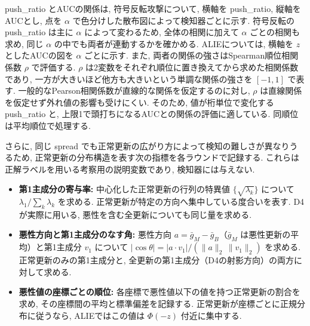 \documentclass[a4j, twocolumn, dvipdfmx]{jsarticle}
\newcommand{\PushRatio}{\textrm{push\_ratio}}
\newcommand{\Spread}{\textrm{spread}}
\begin{document}
\PushRatio{} とAUCの関係は, 符号反転攻撃について, 横軸を \PushRatio{}, 縦軸をAUCとし, 点を $\alpha$ で色分けした散布図によって検知器ごとに示す. 符号反転の \PushRatio{} は主に $\alpha$ によって変わるため, 全体の相関に加えて $\alpha$ ごとの相関も求め, 同じ $\alpha$ の中でも両者が連動するかを確かめる. ALIEについては, 横軸を $z$ としたAUCの図を $\alpha$ ごとに示す. また, 両者の関係の強さはSpearman順位相関係数 $\rho$ で評価する. $\rho$ は2変数をそれぞれ順位に置き換えてから求めた相関係数であり, 一方が大きいほど他方も大きいという単調な関係の強さを $[-1,1]$ で表す. 一般的なPearson相関係数が直線的な関係を仮定するのに対し, $\rho$ は直線関係を仮定せず外れ値の影響も受けにくい. そのため, 値が桁単位で変化する \PushRatio{} と, 上限1で頭打ちになるAUCとの関係の評価に適している. 同順位は平均順位で処理する.

さらに, 同じ \Spread{} でも正常更新の広がり方によって検知の難しさが異なりうるため, 正常更新の分布構造を表す次の指標を各ラウンドで記録する. これらは正解ラベルを用いる考察用の説明変数であり, 検知器には与えない.
\begin{itemize}
  \item \textbf{第1主成分の寄与率:} 中心化した正常更新の行列の特異値 $\{\sqrt{\lambda_k}\}$ について $\lambda_1 / \sum_k \lambda_k$ を求める. 正常更新が特定の方向へ集中している度合いを表す. D4が実際に用いる, 悪性を含む全更新についても同じ量を求める.
  \item \textbf{悪性方向と第1主成分のなす角:} 悪性方向 $a = \bar{g}_M - \bar{g}_B$（$\bar{g}_M$ は悪性更新の平均）と第1主成分 $v_1$ について $|\cos\theta| = |a \cdot v_1| / (\|a\|_2\,\|v_1\|_2)$ を求める. 正常更新のみの第1主成分と, 全更新の第1主成分（D4の射影方向）の両方に対して求める.
  \item \textbf{悪性値の座標ごとの順位:} 各座標で悪性値以下の値を持つ正常更新の割合を求め, その座標間の平均と標準偏差を記録する. 正常更新が座標ごとに正規分布に従うなら, ALIEではこの値は $\Phi(-z)$ 付近に集中する.
\end{itemize}


\end{document}
